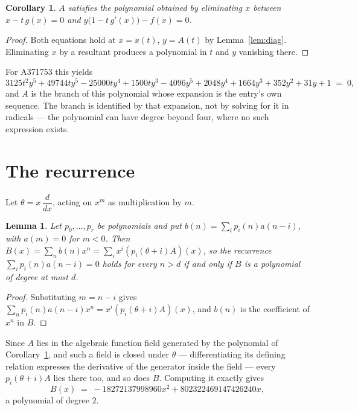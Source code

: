 \documentclass[11pt,a4paper]{article}
\theoremstyle{plain}
\newtheorem{lemma}[theorem]{Lemma}
\newtheorem{corollary}[theorem]{Corollary}
\theoremstyle{definition}
\begin{document}
\begin{corollary}\label{cor:minpoly}
$A$ satisfies the polynomial obtained by eliminating $x$ between
$x-t\,g(x)=0$ and $y\bigl(1-t\,g'(x)\bigr)-f(x)=0$.
\end{corollary}

\begin{proof}
Both equations hold at $x=x(t)$, $y=A(t)$ by Lemma~\ref{lem:diag}. Eliminating $x$ by a
resultant produces a polynomial in $t$ and $y$ vanishing there.
\end{proof}

For A371753 this yields
\[
3125 t^{2} y^{5} + 49744 t y^{5} - 25000 t y^{4} + 1500 t y^{3} - 4096 y^{5} + 2048 y^{4} + 1664 y^{3} + 352 y^{2} + 31 y + 1 \;=\;0 ,
\]
and $A$ is the branch of this polynomial whose expansion is the entry's own sequence.
The branch is identified by that expansion, not by solving for it in radicals --- the
polynomial can have degree beyond four, where no such expression exists.

\section{The recurrence}

Let $\theta=x\,\dfrac{d}{dx}$, acting on $x^{m}$ as multiplication by $m$.

\begin{lemma}\label{lem:transfer}
Let $p_{0},\dots,p_{r}$ be polynomials and put $b(n)=\sum_{i}p_{i}(n)a(n-i)$, with
$a(m)=0$ for $m<0$. Then $B(x)=\sum_{n}b(n)x^{n}=\sum_{i}x^{i}(p_{i}(\theta+i)A)(x)$, so
the recurrence $\sum_{i}p_{i}(n)a(n-i)=0$ holds for every $n>d$ if and only if $B$ is a
polynomial of degree at most $d$.
\end{lemma}

\begin{proof}
Substituting $m=n-i$ gives $\sum_{n}p_{i}(n)a(n-i)x^{n}=x^{i}(p_{i}(\theta+i)A)(x)$, and
$b(n)$ is the coefficient of $x^{n}$ in $B$.
\end{proof}

Since $A$ lies in the algebraic function field generated by the polynomial of
Corollary~\ref{cor:minpoly}, and such a field is closed under $\theta$ --- differentiating
its defining relation expresses the derivative of the generator inside the field ---
every $p_{i}(\theta+i)A$ lies there too, and so does $B$. Computing it exactly gives
\[
B(x)\;=\;- 18272137998960 x^{2} + 802322469147426240 x ,
\]
a polynomial of degree $2$.
\end{document}
